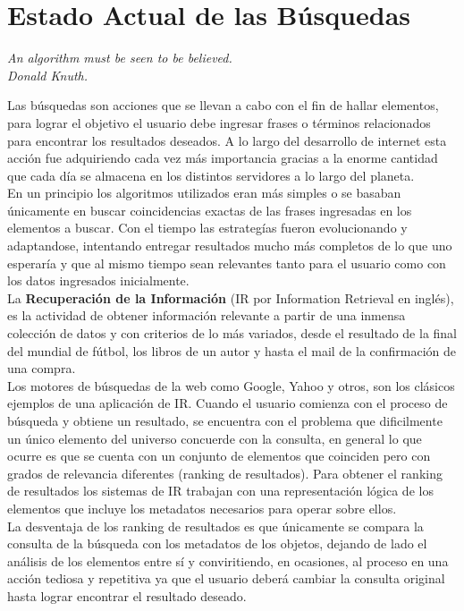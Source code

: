 \section{Estado Actual de las Búsquedas}
{\begin{small}%
\begin{flushright}%
\it An algorithm must be seen to be believed.\\Donald Knuth.
\end{flushright}%
\end{small}%
\vspace{.5cm}}
Las búsquedas son acciones que se llevan a cabo con el fin de hallar elementos, para lograr el objetivo el usuario debe ingresar frases o términos relacionados para encontrar los resultados deseados. A lo largo del desarrollo de internet esta acción fue adquiriendo cada vez más importancia gracias a la enorme cantidad que cada día se almacena en los distintos servidores a lo largo del planeta.\\
En un principio los algoritmos utilizados eran más simples o se basaban únicamente en buscar coincidencias exactas de las frases ingresadas en los elementos a buscar. Con el tiempo las estrategías fueron evolucionando y adaptandose, intentando entregar resultados mucho más completos de lo que uno esperaría y que al mismo tiempo sean relevantes tanto para el usuario como con los datos ingresados inicialmente.\\
La \textbf{Recuperación de la Información} (IR por Information Retrieval en inglés), es la actividad de obtener información relevante a partir de una inmensa colección de datos y con criterios de lo más variados, desde el resultado de la final del mundial de fútbol, los libros de un autor y hasta el mail de la confirmación de una compra.\\
Los motores de búsquedas de la web como Google, Yahoo y otros, son los clásicos ejemplos de una aplicación de IR. Cuando el usuario comienza con el proceso de búsqueda y obtiene un resultado, se encuentra con el problema que dificilmente un único elemento del universo concuerde con la consulta, en general lo que ocurre es que se cuenta con un conjunto de elementos que coinciden pero con grados de relevancia diferentes (ranking de resultados). Para obtener el ranking de resultados los sistemas de IR trabajan con una representación lógica de los elementos que incluye los metadatos necesarios para operar sobre ellos.\\
La desventaja de los ranking de resultados es que únicamente se compara la consulta de la búsqueda con los metadatos de los objetos, dejando de lado el análisis de los elementos entre sí y conviritiendo, en ocasiones, al proceso en una acción tediosa y repetitiva ya que el usuario deberá cambiar la consulta original hasta lograr encontrar el resultado deseado.\\
